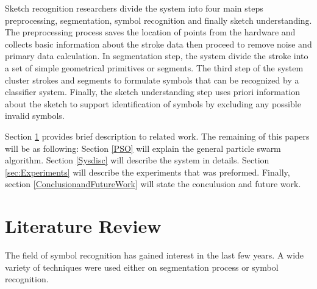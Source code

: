 \documentclass[a4paper,10pt]{IEEEconf}
\begin{document}
Sketch recognition researchers divide the system into four main steps preprocessing, segmentation, symbol recognition and finally sketch understanding. The preprocessing process saves the location of points from the hardware and collects basic information about the stroke data then proceed to remove noise and primary data calculation.  In segmentation step, the system  divide the stroke into a set of simple geometrical primitives or segments.  The third step of the system cluster strokes and segments to formulate symbols that can be recognized by a classifier system. Finally, the sketch understanding step uses priori information about the sketch to support identification of symbols by excluding any possible invalid symbols. 

Section \ref{Sec:RelatedWork} provides brief description to related work. The remaining of this papers will be as following: Section \ref{PSO} will explain the general particle swarm algorithm. Section \ref{Sysdisc} will describe the system in details.  Section \ref{sec:Experiments} will describe the experiments that was preformed. Finally, section \ref{ConclusionandFutureWork} will state the conculusion and future work. 
\section{Literature Review}
\label{Sec:RelatedWork}
The field of symbol recognition has gained interest in the last few years. A wide variety of techniques were used either on segmentation process or symbol recognition.
\end{document}
